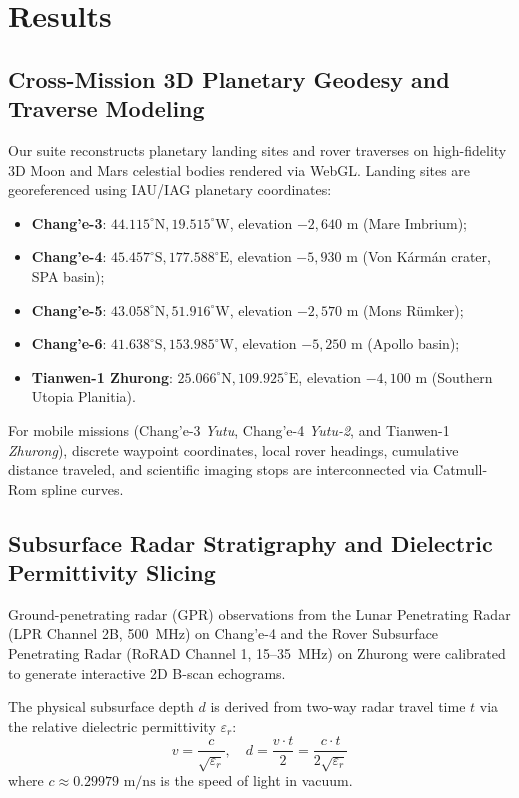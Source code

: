 \section{Results}

\subsection{Cross-Mission 3D Planetary Geodesy and Traverse Modeling}

Our suite reconstructs planetary landing sites and rover traverses on high-fidelity 3D Moon and Mars celestial bodies rendered via WebGL. Landing sites are georeferenced using IAU/IAG planetary coordinates:
\begin{itemize}
    \item \textbf{Chang'e-3}: $44.115^\circ\text{N}, 19.515^\circ\text{W}$, elevation $-2,640\text{ m}$ (Mare Imbrium);
    \item \textbf{Chang'e-4}: $45.457^\circ\text{S}, 177.588^\circ\text{E}$, elevation $-5,930\text{ m}$ (Von K\'{a}rm\'{a}n crater, SPA basin);
    \item \textbf{Chang'e-5}: $43.058^\circ\text{N}, 51.916^\circ\text{W}$, elevation $-2,570\text{ m}$ (Mons R\"{u}mker);
    \item \textbf{Chang'e-6}: $41.638^\circ\text{S}, 153.985^\circ\text{W}$, elevation $-5,250\text{ m}$ (Apollo basin);
    \item \textbf{Tianwen-1 Zhurong}: $25.066^\circ\text{N}, 109.925^\circ\text{E}$, elevation $-4,100\text{ m}$ (Southern Utopia Planitia).
\end{itemize}

For mobile missions (Chang'e-3 \textit{Yutu}, Chang'e-4 \textit{Yutu-2}, and Tianwen-1 \textit{Zhurong}), discrete waypoint coordinates, local rover headings, cumulative distance traveled, and scientific imaging stops are interconnected via Catmull-Rom spline curves.

\subsection{Subsurface Radar Stratigraphy and Dielectric Permittivity Slicing}

Ground-penetrating radar (GPR) observations from the Lunar Penetrating Radar (LPR Channel 2B, 500~MHz) on Chang'e-4 and the Rover Subsurface Penetrating Radar (RoRAD Channel 1, 15--35~MHz) on Zhurong were calibrated to generate interactive 2D B-scan echograms.

The physical subsurface depth $d$ is derived from two-way radar travel time $t$ via the relative dielectric permittivity $\varepsilon_r$:
\begin{equation}
    v = \frac{c}{\sqrt{\varepsilon_r}}, \quad d = \frac{v \cdot t}{2} = \frac{c \cdot t}{2\sqrt{\varepsilon_r}}
    \label{eq:radar_depth}
\end{equation}
where $c \approx 0.29979\text{ m/ns}$ is the speed of light in vacuum.

